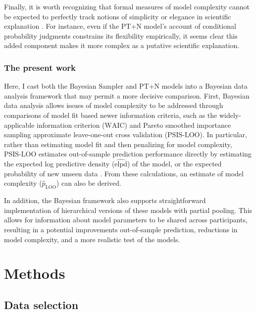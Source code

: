 \documentclass[
  english,
  man,floatsintext]{apa6}
\begin{document}
Finally, it is worth recognizing that formal measures of model complexity cannot be expected to perfectly track notions of simplicity or elegance in scientific explanation \autocites[for some related discussions, see][]{kuhn1977,sober2002,piantadosi2018}. For instance, even if the PT+N model's account of conditional probability judgments constrains its flexibility empirically, it seems clear this added component makes it more complex as a putative scientific explanation.

\hypertarget{the-present-work}{%
\subsubsection{The present work}\label{the-present-work}}

Here, I cast both the Bayesian Sampler and PT+N models into a Bayesian data analysis framework that may permit a more decisive comparison. First, Bayesian data analysis allows issues of model complexity to be addressed through comparisons of model fit based newer information criteria, such as the widely-applicable information criterion (\({\text{WAIC}}\)) and Pareto smoothed importance sampling approximate leave-one-out cross validation (\(\text{PSIS-LOO}\)). In particular, rather than estimating model fit and then penalizing for model complexity, \(\text{PSIS-LOO}\) estimates out-of-sample prediction performance directly by estimating the expected log predictive density (\(\widehat{\text{elpd}}\)) of the model, or the expected probability of new unseen data \autocite{gelman.etal2014,vehtari.etal2017}. From these calculations, an estimate of model complexity (\(\hat{p}_{\text{LOO}}\)) can also be derived.

In addition, the Bayesian framework also supports straightforward implementation of hierarchical versions of these models with partial pooling. This allows for information about model parameters to be shared across participants, resulting in a potential improvements out-of-sample prediction, reductions in model complexity, and a more realistic test of the models.

\hypertarget{methods}{%
\section{Methods}\label{methods}}

\hypertarget{data-selection}{%
\subsection{Data selection}\label{data-selection}}
\end{document}
